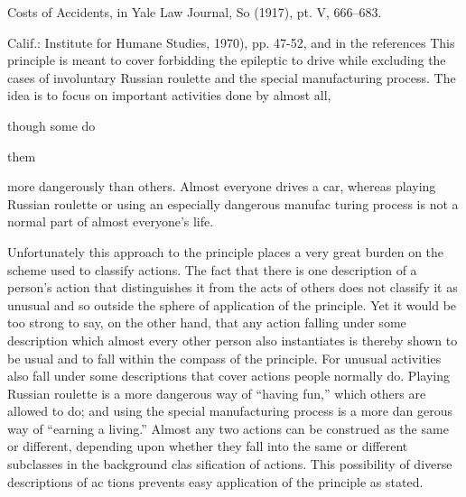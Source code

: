 \documentclass[11pt,openany]{book}
\begin{document}
Costs of Accidents, in Yale Law Journal, So (1917), pt. V, 666--683. 

Calif.: Institute for Humane Studies, 1970), pp. 47-52, and in the references This principle is meant to cover forbidding the epileptic to drive while excluding the cases of involuntary Russian roulette and the special manufacturing process. The idea is to focus on important activities done by almost all, 

though some do 

them 

more dangerously than others. Almost everyone drives a car, whereas playing Russian roulette or using an especially dangerous manufac turing process is not a normal part of almost everyone's life. 

Unfortunately this approach to the principle places a very great burden on the scheme used to classify actions. The fact that there is one description of a person's action that distinguishes it from the acts of others does not classify it as unusual and so outside the sphere of application of the principle. Yet it would be too strong to say, on the other hand, that any action falling under some description which almost every other person also instantiates is thereby shown to be usual and to fall within the compass of the principle. For unusual activities also fall under some descriptions that cover actions people normally do. Playing Russian roulette is a more dangerous way of ``having fun,'' which others are allowed to do; and using the special manufacturing process is a more dan gerous way of ``earning a living.'' Almost any two actions can be construed as the same or different, depending upon whether they fall into the same or different subclasses in the background clas sification of actions. This possibility of diverse descriptions of ac tions prevents easy application of the principle as stated. 
\end{document}
